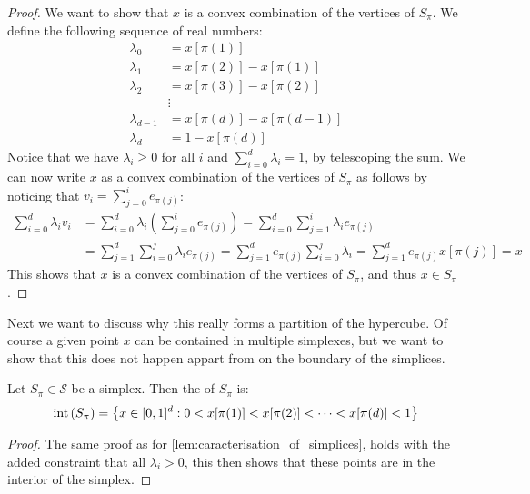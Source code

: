 \begin{proof}
    We want to show that $x$ is a convex combination of the vertices of $S_{\pi}$. We define the following sequence of real numbers:
    \begin{align*}
        \lambda_0     & = x[\pi(1)]               \\
        \lambda_1     & = x[\pi(2)] - x[\pi(1)]   \\
        \lambda_2     & = x[\pi(3)] - x[\pi(2)]   \\
                      & \vdots                    \\
        \lambda_{d-1} & = x[\pi(d)] - x[\pi(d-1)] \\
        \lambda_d     & = 1 - x[\pi(d)]
    \end{align*}
    Notice that we have $\lambda_i \geq 0$ for all $i$ and $\sum_{i=0}^{d} \lambda_i = 1$, by telescoping the sum. We can now write $x$ as a convex combination of the vertices of $S_{\pi}$ as follows by noticing that $v_i = \sum_{j=0}^{i} e_{\pi(j)}$:
    \begin{align*}
        \sum_{i=0}^{d} \lambda_i v_i & = \sum_{i=0}^{d} \lambda_i \left( \sum_{j=0}^{i} e_{\pi(j)} \right)  = \sum_{i=0}^{d} \sum_{j=1}^{i} \lambda_i e_{\pi(j)}                                \\
                                     & = \sum_{j=1}^{d} \sum_{i=0}^{j} \lambda_i e_{\pi(j)}  = \sum_{j=1}^{d} e_{\pi(j)} \sum_{i=0}^{j} \lambda_i		 = \sum_{j=1}^{d} e_{\pi(j)} x[\pi(j)]		     = x
    \end{align*}
    This shows that $x$ is a convex combination of the vertices of $S_{\pi}$, and thus $x \in S_{\pi}$.
\end{proof}
Next we want to discuss why this really forms a partition of the hypercube. Of course a given point $x$ can be contained in multiple simplexes, but we want to show that this does not happen appart from on the boundary of the simplices.
\begin{lemma}
    Let $S_{\pi} \in \mathcal{S}$ be a simplex. Then the  of $S_{\pi}$ is:
    \begin{align*}
        \text{int}\left(S_{\pi}\right) = \left\{x \in [0, 1]^d : 0 < x[\pi(1)] < x[\pi(2)] < \dots < x[\pi(d)] < 1\right\}
    \end{align*}
\end{lemma}
\begin{proof}
    The same proof as for \cref{lem:caracterisation_of_simplices}, holds with the added constraint that all $\lambda_i > 0$, this then shows that these points are in the interior of the simplex.
\end{proof}

